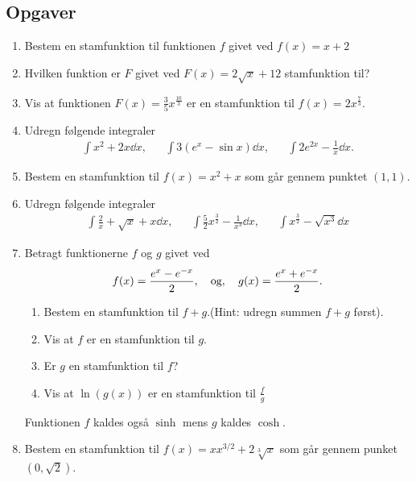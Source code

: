 \subsection{Opgaver}


\begin{enumerate}
	\item Bestem en stamfunktion til funktionen $f$ givet ved $f(x)=x+2$
	
	\item Hvilken funktion er $F$ givet ved $F(x)= 2\sqrt{x}+12$ stamfunktion til?
	
	\item Vis at funktionen $F(x)=\frac{3}{5}x^{\frac{10}{3}}$ er en stamfunktion til $f(x)=2x^{\frac{7}{3}}$.
	
	\item Udregn følgende integraler
	\begin{align*}
	\int x^2+2x\dd x,&& \int 3(e^x-\sin x) \dd x,&& \int 2e^{2x}-\frac{1}{x} \dd x.
	\end{align*}
	
	\item Bestem en stamfunktion til $f(x)=x^2+x$ som går gennem punktet $(1,1)$. 
	
	\item Udregn følgende integraler
	\begin{align*}
	\int \frac{2}{x}+\sqrt{x}+x \dd x,&& \int \frac{5}{2} x^{\frac{3}{2}}-\frac{1}{x^3} \dd x,&& \int x^{\frac{3}{2}}-\sqrt{x^3}\dd x
	\end{align*}
	
	\item\label{it:int11} Betragt funktionerne $f$ og $g$ givet ved
	\begin{align*}
	f(x)=\frac{e^x-e^{-x}}{2},\quad \textup{og},\quad g(x)=\frac{e^x+e^{-x}}{2}.
	\end{align*}
	\begin{enumerate}
		\item Bestem en stamfunktion til $f+g$.(Hint: udregn summen  $f+g$ først).
		\item Vis at $f$ er en stamfunktion til $g$.
		\item Er $g$ en stamfunktion til $f$?
		\item Vis at $ \ln(g(x)) $ er en stamfunktion til $ \frac{f}{g} $
	\end{enumerate}
	Funktionen $f$ kaldes også $\sinh$ mens $g$ kaldes $\cosh$.

	\item Bestem en stamfunktion til $f(x)=xx^{3/2}+2\sqrt[3]{x}$ som går gennem punket $ (0,\sqrt{2}) $. 
	

\end{enumerate}
